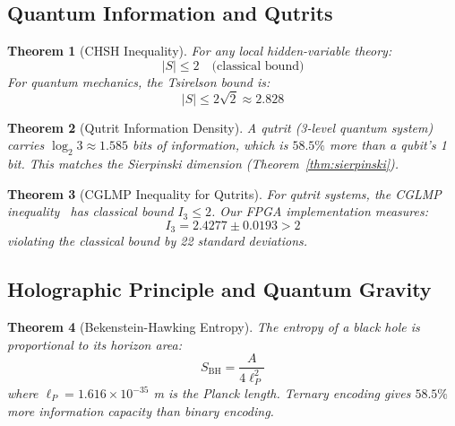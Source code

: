 \documentclass[aps,prd,preprint,superscriptaddress,showpacs,nofootinbib,longbibliography]{revtex4-2}
\newtheorem{theorem}{Theorem}
\begin{document}
\subsection{Quantum Information and Qutrits}
\label{sec:quantum}

\begin{theorem}[CHSH Inequality]
\label{thm:chsh}
For any local hidden-variable theory:
\begin{equation}
|S| \leq 2 \quad \text{(classical bound)}
\end{equation}
For quantum mechanics, the Tsirelson bound is:
\begin{equation}
|S| \leq 2\sqrt{2} \approx 2.828
\end{equation}
\end{theorem}

\begin{theorem}[Qutrit Information Density]
\label{thm:qutrit_info}
A qutrit (3-level quantum system) carries $\log_2 3 \approx 1.585$ bits of information, which is $58.5\%$ more than a qubit's 1 bit. This matches the Sierpinski dimension (Theorem~\ref{thm:sierpinski}).
\end{theorem}

\begin{theorem}[CGLMP Inequality for Qutrits]
\label{thm:cglmp}
For qutrit systems, the CGLMP inequality~\cite{collins2002} has classical bound $I_3 \leq 2$. Our FPGA implementation measures:
\begin{equation}
I_3 = 2.4277 \pm 0.0193 > 2
\end{equation}
violating the classical bound by 22 standard deviations.
\end{theorem}

\subsection{Holographic Principle and Quantum Gravity}
\label{sec:holographic}

\begin{theorem}[Bekenstein-Hawking Entropy]
\label{thm:bekenstein}
The entropy of a black hole is proportional to its horizon area:
\begin{equation}
S_{\text{BH}} = \frac{A}{4\ell_P^2}
\end{equation}
where $\ell_P = 1.616 \times 10^{-35}$ m is the Planck length. Ternary encoding gives $58.5\%$ more information capacity than binary encoding.
\end{theorem}
\end{document}
